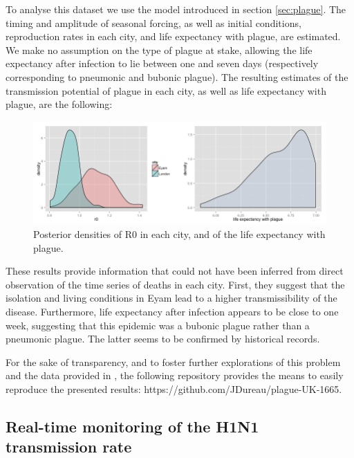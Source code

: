\documentclass[a4paper,11pt,titlepage]{article}
\theoremstyle{plain} %
\begin{document}
To analyse this dataset we use the model introduced in section \ref{sec:plague}. The timing and amplitude of seasonal forcing, as well as initial conditions, reproduction rates in each city, and life expectancy with plague, are estimated. We make no assumption
on the type of plague at stake, allowing the life expectancy after infection to lie between one and seven days
(respectively corresponding to pneumonic and bubonic plague). The resulting estimates of the transmission potential of plague in each city, as well as life expectancy with plague, are the following:

\begin{figure}[h]
\begin{centering}
\includegraphics[scale=0.5]{Plague_post.png}
\par\end{centering}

\caption{\label{fig:What-could-habe}Posterior densities of R0 in each city, and of the life expectancy with plague.}
\end{figure}

These results provide information that could not have been inferred from direct observation of the time series of
deaths in each city. First, they suggest that the isolation and living conditions in Eyam lead to a higher transmissibility of the
disease. Furthermore, life expectancy after infection appears to be close to one week, suggesting that this epidemic
was a bubonic plague rather than a pneumonic plague. The latter seems to be confirmed by historical records.

For the sake of transparency, and to foster further explorations of this problem and the data provided 
in \cite{Welford2009}, the following repository provides the means to easily reproduce the presented results: https://github.com/JDureau/plague-UK-1665.


\subsection{Real-time monitoring of the H1N1 transmission rate}
\end{document}

